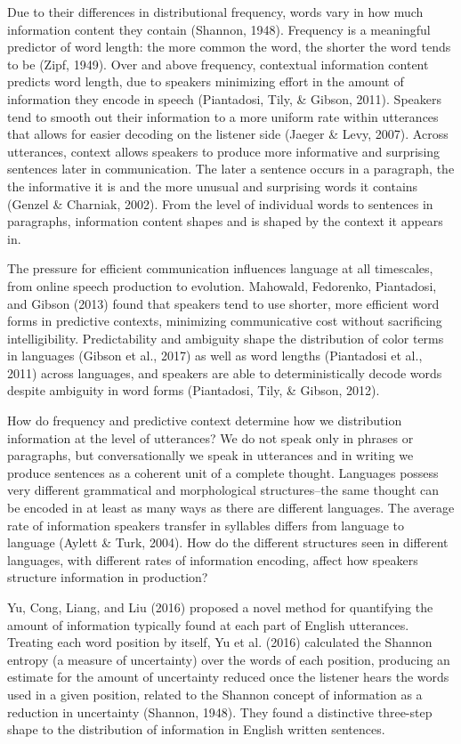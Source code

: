 \documentclass[man,floatsintext]{apa6}
\begin{document}
Due to their differences in distributional frequency, words vary in how much information content they contain (Shannon, 1948). Frequency is a meaningful predictor of word length: the more common the word, the shorter the word tends to be (Zipf, 1949). Over and above frequency, contextual information content predicts word length, due to speakers minimizing effort in the amount of information they encode in speech (Piantadosi, Tily, \& Gibson, 2011). Speakers tend to smooth out their information to a more uniform rate within utterances that allows for easier decoding on the listener side (Jaeger \& Levy, 2007). Across utterances, context allows speakers to produce more informative and surprising sentences later in communication. The later a sentence occurs in a paragraph, the the informative it is and the more unusual and surprising words it contains (Genzel \& Charniak, 2002). From the level of individual words to sentences in paragraphs, information content shapes and is shaped by the context it appears in.

The pressure for efficient communication influences language at all timescales, from online speech production to evolution. Mahowald, Fedorenko, Piantadosi, and Gibson (2013) found that speakers tend to use shorter, more efficient word forms in predictive contexts, minimizing communicative cost without sacrificing intelligibility. Predictability and ambiguity shape the distribution of color terms in languages (Gibson et al., 2017) as well as word lengths (Piantadosi et al., 2011) across languages, and speakers are able to deterministically decode words despite ambiguity in word forms (Piantadosi, Tily, \& Gibson, 2012).

How do frequency and predictive context determine how we distribution information at the level of utterances? We do not speak only in phrases or paragraphs, but conversationally we speak in utterances and in writing we produce sentences as a coherent unit of a complete thought. Languages possess very different grammatical and morphological structures--the same thought can be encoded in at least as many ways as there are different languages. The average rate of information speakers transfer in syllables differs from language to language (Aylett \& Turk, 2004). How do the different structures seen in different languages, with different rates of information encoding, affect how speakers structure information in production?

Yu, Cong, Liang, and Liu (2016) proposed a novel method for quantifying the amount of information typically found at each part of English utterances. Treating each word position by itself, Yu et al. (2016) calculated the Shannon entropy (a measure of uncertainty) over the words of each position, producing an estimate for the amount of uncertainty reduced once the listener hears the words used in a given position, related to the Shannon concept of information as a reduction in uncertainty (Shannon, 1948). They found a distinctive three-step shape to the distribution of information in English written sentences.
\end{document}
